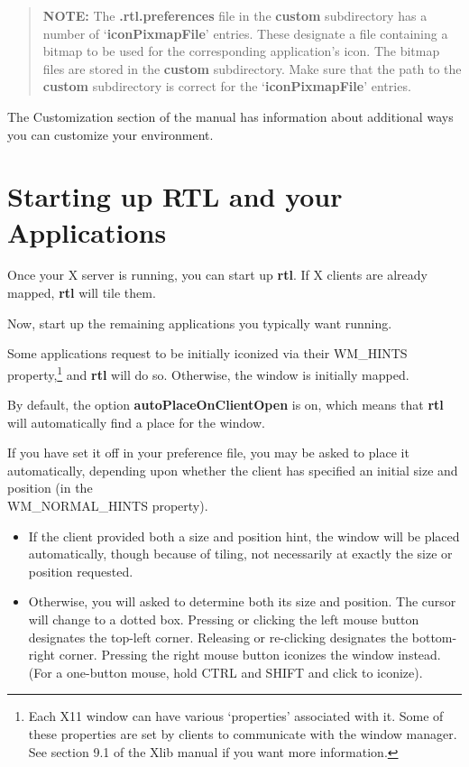 \begin{quotation}
{\bf NOTE:}
The {\bf .rtl.preferences} file in the {\bf custom} subdirectory has a number
of `{\bf iconPixmapFile}' entries.  These designate a file containing
a bitmap to be used for the corresponding application's icon.
The bitmap files are stored in the {\bf custom} subdirectory.  Make
sure that the path to the {\bf custom} subdirectory is correct for
the `{\bf iconPixmapFile}' entries.
\end{quotation}

The Customization section of the manual has information about additional ways
you can customize your environment.

\section{Starting up RTL and your Applications}

Once your X server is running, you can start up {\bf rtl}.
If X clients are already mapped, {\bf rtl} will tile them.

Now, start up the remaining applications you typically want
running.

Some applications request to be initially iconized
via their {\sc WM\_HINTS} property,\footnote{Each X11 window can have
various `properties' associated with it.  Some of these
properties are set by clients to communicate with the window manager.
See section 9.1 of the Xlib manual if you want more information.}
and {\bf rtl} will do so.  Otherwise, the window is initially
mapped.

By default, the option {\bf autoPlaceOnClientOpen} is on, which means that
{\bf rtl} will automatically find a place for the window.

If you have set it off in your preference file, you may be asked to
place it automatically, depending upon whether the client has specified
an initial size and position (in the \\ {\sc WM\_NORMAL\_HINTS} property).

\begin{itemize}
\item If the client provided both a size and position hint, the window
will be placed automatically, though because of tiling, not necessarily
at exactly the size or position requested.

\item Otherwise, you will asked to determine
both its size and position.  The cursor will change to a dotted box.
Pressing or clicking the left mouse button designates the top-left
corner.  Releasing or re-clicking designates the bottom-right corner.
Pressing the right mouse button iconizes the window instead.
(For a one-button mouse, hold CTRL and SHIFT and click to iconize).
\end{itemize}

